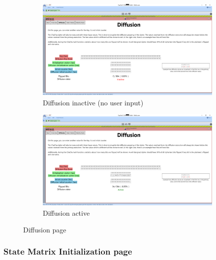 \begin{figure}
\centering
\begin{subfigure}[t]{\textwidth}
  \centering
  \includegraphics[width=\textwidth]{figures/diffusion-inactive}
  \caption{Diffusion inactive (no user input)}
  \label{fig:diffusion.inactive}
\end{subfigure}
\begin{subfigure}[t]{\textwidth}
  \centering
  \includegraphics[width=\textwidth]{figures/diffusion-active}
  \caption{Diffusion active}
  \label{fig:diffusion.active}
\end{subfigure}
\caption{Diffusion page}
\label{fig:diffusion}
\end{figure}

\subsubsection{State Matrix Initialization page}

